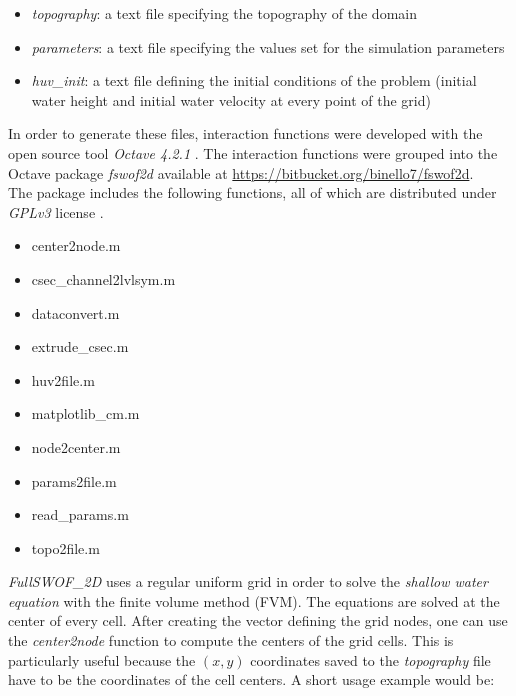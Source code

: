 \begin{itemize}
\itemsep0em
  \item \textit{topography}: a text file specifying the topography of the domain
  \item \textit{parameters}: a text file specifying the values set for the simulation parameters
  \item \textit{huv\_init}: a text file defining the initial conditions of the problem (initial water height and initial water velocity at every point of the grid)
\end{itemize}

In order to generate these files, interaction functions were developed with the open source tool \textit{Octave 4.2.1} \autocite{octave_community_gnu_2018}.
The interaction functions were grouped into the Octave package \textit{fswof2d} available at \url{https://bitbucket.org/binello7/fswof2d}.\\

The package includes the following functions, all of which are distributed under \textit {GPLv3} license \autocite{smith_quick_2014}.

\begin{itemize}
\itemsep0em
  \item center2node.m
  \item csec\_channel2lvlsym.m
  \item dataconvert.m
  \item extrude\_csec.m
  \item huv2file.m
  \item matplotlib\_cm.m
  \item node2center.m
  \item params2file.m
  \item read\_params.m
  \item topo2file.m
\end{itemize}



\textit{FullSWOF\_2D} uses a regular uniform grid in order to solve the \emph{shallow water equation} with the finite volume method (FVM).
The equations are solved at the center of every cell.
After creating the vector defining the grid nodes, one can use the \textit{center2node} function to compute the centers of the grid cells.
This is particularly useful because the $(x,y)$ coordinates saved to the \textit{topography} file have to be the coordinates of the cell centers.
A short usage example would be:







